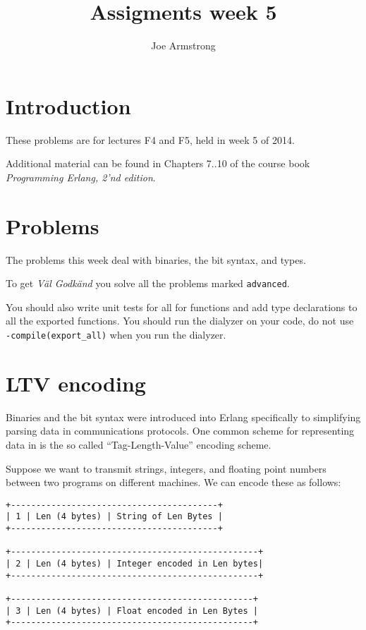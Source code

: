 \documentclass[12pt]{hitec}
\title{Assigments week 5}
\author{Joe Armstrong}
\begin{document}
\maketitle

\tableofcontents

\section{Introduction}
These problems are for lectures F4 and F5, held in week 5 of 2014.

Additional material can be found in Chapters 7..10 of the course book
{\sl Programming Erlang, 2'nd edition}.

\section{Problems}

The problems this week deal with binaries, the bit syntax, and types.

To get {\sl V\"{a}l Godk\"{a}nd} you solve all the problems marked
\verb+advanced+.

You should also write unit tests for all for functions and add type
declarations to all the exported functions. You should run the dialyzer
on your code, do not use \verb+-compile(export_all)+ when you run the dialyzer.

\section{LTV encoding}

Binaries and the bit syntax were introduced into Erlang specifically to
simplifying parsing data in communications protocols. 
One common scheme for representing data in
is the so called ``Tag-Length-Value'' encoding scheme.

Suppose we want to transmit strings, integers, and floating point numbers
between two programs on different machines. We can encode these as follows:

\begin{verbatim}
+-----------------------------------------+
| 1 | Len (4 bytes) | String of Len Bytes |
+-----------------------------------------+

+-------------------------------------------------+
| 2 | Len (4 bytes) | Integer encoded in Len bytes|
+-------------------------------------------------+

+------------------------------------------------+
| 3 | Len (4 bytes) | Float encoded in Len Bytes |
+------------------------------------------------+
\end{verbatim}
\end{document}
